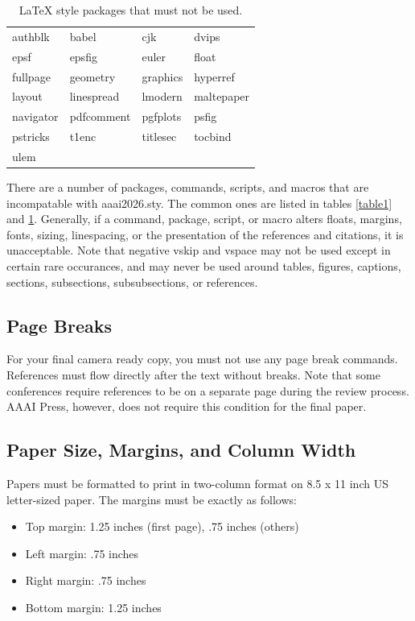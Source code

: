 \begin{table}[t]
\centering
\begin{tabular}{l|l|l|l}
    authblk & babel & cjk & dvips \\
    epsf & epsfig & euler & float \\
    fullpage & geometry & graphics & hyperref \\
    layout & linespread & lmodern & maltepaper \\
    navigator & pdfcomment & pgfplots & psfig \\
    pstricks & t1enc & titlesec & tocbind \\
    ulem
\end{tabular}
\caption{LaTeX style packages that must not be used.}
\label{table2}
\end{table}

There are a number of packages, commands, scripts, and macros that are incompatable with aaai2026.sty. The common ones are listed in tables \ref{table1} and \ref{table2}. Generally, if a command, package, script, or macro alters floats, margins, fonts, sizing, linespacing, or the presentation of the references and citations, it is unacceptable. Note that negative vskip and vspace may not be used except in certain rare occurances, and may never be used around tables, figures, captions, sections, subsections, subsubsections, or references.


\subsection{Page Breaks}
For your final camera ready copy, you must not use any page break commands. References must flow directly after the text without breaks. Note that some conferences require references to be on a separate page during the review process. AAAI Press, however, does not require this condition for the final paper.


\subsection{Paper Size, Margins, and Column Width}
Papers must be formatted to print in two-column format on 8.5 x 11 inch US letter-sized paper. The margins must be exactly as follows:
\begin{itemize}
\item Top margin: 1.25 inches (first page), .75 inches (others)
\item Left margin: .75 inches
\item Right margin: .75 inches
\item Bottom margin: 1.25 inches
\end{itemize}


